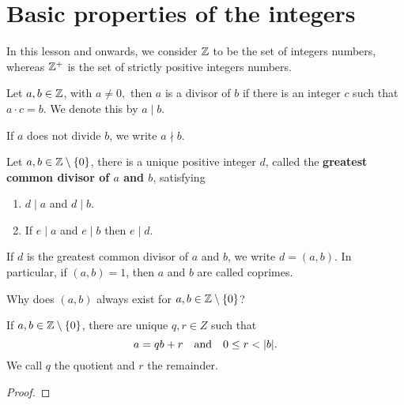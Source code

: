 \documentclass[11pt,a4paper]{article}
\begin{document}
\def\contador{1}


\section{Basic properties of the integers}

In this lesson and onwards, we consider $\mathbb{Z}$ to be the set of integers numbers, whereas $\mathbb{Z}^{+}$ is the set of strictly positive integers numbers.

\begin{defi}
Let $a,b\in \mathbb{Z}$, with $a\neq 0,$ then $a$ is a divisor of $b$ if there is an integer $c$ such that $a\cdot c=b$. We denote this by $a\mid b.$ 
\end{defi}

\begin{rem}
    If $a$ does not divide $b$, we write $a\nmid b$.
\end{rem}

\begin{teo}
    Let $a,b\in \mathbb{Z}\setminus\{0\}$, there is a unique positive integer $d$, called the \textbf{greatest common divisor of $a$ and $b$}, satisfying 
    \begin{enumerate}
        \item $d\mid a$ and $d\mid b.$
        \item If $e\mid a$ and $e\mid b$ then $e\mid d.$
    \end{enumerate}
\end{teo}

\begin{rem}
    If $d$ is the greatest common divisor of $a$ and $b$, we write $d=(a,b).$ In particular, if $(a,b)=1$, then $a$ and $b$ are called coprimes.
\end{rem}

\begin{que}
    Why does $(a,b)$ always exist for $a,b\in \mathbb{Z}\setminus\{0\}$?
\end{que}


\begin{teo}
    If \(a,b\in \mathbb{Z}\setminus\{0\}\), 
    there are unique \(q,r\in Z\)
    such that 
    \[a= qb +r \quad\text{and}\quad 0\leq r < |b|.\]
    We call \(q\) the quotient and \(r\) the remainder.
\end{teo}

\begin{proof}
    
\end{proof}
\end{document}
